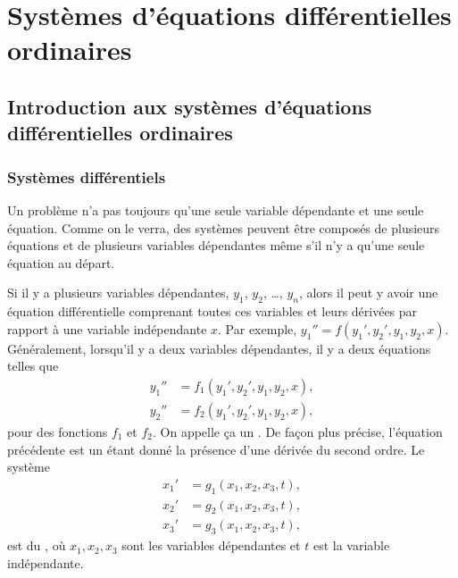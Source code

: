 \chapter{Systèmes d’équations différentielles ordinaires} \label{sys:chapter}


\section{Introduction aux systèmes d'équations différentielles ordinaires} \label{sec:introtosys}


\subsection{Systèmes différentiels}

Un problème n'a pas toujours qu'une seule variable dépendante et une seule équation. Comme on le verra, des systèmes peuvent être composés de plusieurs équations et de plusieurs variables dépendantes même s'il n'y a qu’une seule équation au départ.

Si il y a plusieurs variables dépendantes, $y_1$, $y_2$, \ldots, $y_n$,
alors
il peut y avoir une équation différentielle comprenant toutes ces variables et leurs dérivées par rapport à une variable indépendante $x$.
Par exemple, $y_1'' = f(y_1',y_2',y_1,y_2,x)$.
Généralement, lorsqu'il y a deux variables dépendantes, il y a deux équations telles que
\begin{align*}
y_1'' & = f_1(y_1',y_2',y_1,y_2,x) , \\
y_2'' & = f_2(y_1',y_2',y_1,y_2,x) ,
\end{align*}
pour des fonctions $f_1$ et $f_2$.  On appelle ça un
\emph{}.
De façon plus précise, l’équation précédente est un \emph{}
étant donné la présence d’une dérivée du second ordre. Le système
\begin{align*}
x_1' & = g_1(x_1,x_2,x_3,t) , \\
x_2' & = g_2(x_1,x_2,x_3,t) , \\
x_3' & = g_3(x_1,x_2,x_3,t) ,
\end{align*}
est du \emph{}, où $x_1,x_2,x_3$ sont les variables dépendantes et $t$ est la variable indépendante.

